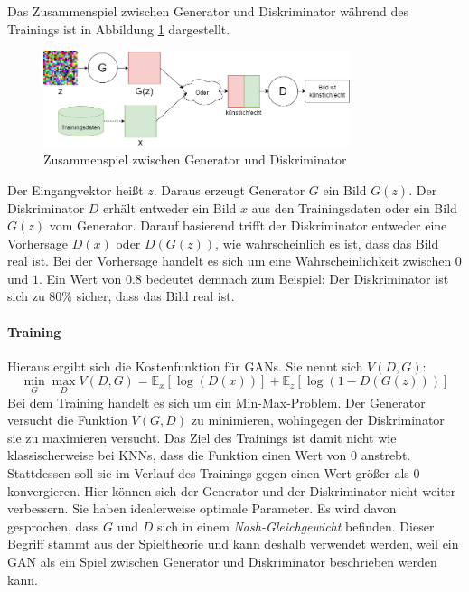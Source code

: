 Das Zusammenspiel zwischen Generator und Diskriminator während des Trainings ist in Abbildung \ref{fig:gan} dargestellt.
\begin{figure}[H]
	\centering
	\includegraphics[width=0.8\textwidth]{../images/GANs/GAN.drawio.png}
	\caption{Zusammenspiel zwischen Generator und Diskriminator}
	\label{fig:gan}
\end{figure}
Der Eingangvektor heißt $z$. Daraus erzeugt Generator $G$ ein Bild $G(z)$. Der Diskriminator $D$ erhält entweder ein Bild $x$ aus den Trainingsdaten oder ein Bild $G(z)$ vom Generator. Darauf basierend trifft der Diskriminator entweder eine Vorhersage $D(x)$ oder $D(G(z))$, wie wahrscheinlich es ist, dass das Bild real ist. Bei der Vorhersage handelt es sich um eine Wahrscheinlichkeit zwischen $0$ und $1$. Ein Wert von $0.8$ bedeutet demnach zum Beispiel: Der Diskriminator ist sich zu 80\% sicher, dass das Bild real ist. \cite{GANs}

\paragraph{Training}
Hieraus ergibt sich die Kostenfunktion für \acp{GAN}. Sie nennt sich $V(D,G)$: \cite{Goodfellow-GANs}
\begin{equation}
   \label{eq:adv_loss}
	\min_{G} \max_{D} V(D,G) = \mathbb{E}_{x}[\log(D(x))] + \mathbb{E}_{z}[\log(1-D(G(z)))]
\end{equation}
Bei dem Training handelt es sich um ein Min-Max-Problem. Der Generator versucht die Funktion $V(G,D)$ zu minimieren, wohingegen der Diskriminator sie zu maximieren versucht. Das Ziel des Trainings ist damit nicht wie klassischerweise bei \acp{KNN}, dass die Funktion einen Wert von $0$ anstrebt. Stattdessen soll sie im Verlauf des Trainings gegen einen Wert größer als $0$ konvergieren. Hier können sich der Generator und der Diskriminator nicht weiter verbessern. Sie haben idealerweise optimale Parameter. Es wird davon gesprochen, dass $G$ und $D$ sich in einem \emph{Nash-Gleichgewicht} befinden. Dieser Begriff stammt aus der Spieltheorie und kann deshalb verwendet werden, weil ein \ac{GAN} als ein Spiel zwischen Generator und Diskriminator beschrieben werden kann. \cite{GANs}

